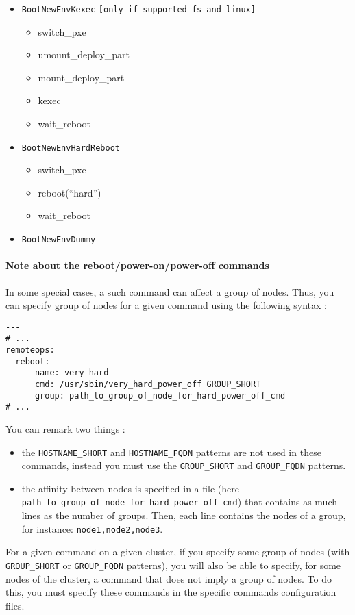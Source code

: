 \documentclass[a4wide,10pt,oneside]{book}
\begin{document}
\begin{itemize}
\begin{itemize}
    \item \texttt{BootNewEnvKexec} \texttt{[only if supported fs and linux]}
      \begin{itemize}
      \item switch\_pxe
      \item umount\_deploy\_part
      \item mount\_deploy\_part
      \item kexec
      \item wait\_reboot
      \end{itemize}
    \item \texttt{BootNewEnvHardReboot}
      \begin{itemize}
      \item switch\_pxe
      \item reboot(``hard'')
      \item wait\_reboot
      \end{itemize}
    \item \texttt{BootNewEnvDummy}
  \end{itemize}
\end{itemize}

\paragraph{Note about the reboot/power-on/power-off commands}\label{sec:groupcmd}
In some special cases, a such command can affect a group of nodes. Thus, you can specify group of nodes for a given command using the following syntax :
\begin{small}
\begin{verbatim}
---
# ...
remoteops:
  reboot:
    - name: very_hard
      cmd: /usr/sbin/very_hard_power_off GROUP_SHORT
      group: path_to_group_of_node_for_hard_power_off_cmd
# ...
\end{verbatim}
\end{small}
You can remark two things :
\begin{itemize}
\item the \texttt{HOSTNAME\_SHORT} and \texttt{HOSTNAME\_FQDN} patterns are not used in these commands, instead you must use the \texttt{GROUP\_SHORT} and \texttt{GROUP\_FQDN} patterns.
\item the affinity between nodes is specified in a file (here \texttt{path\_to\_group\_of\_node\_for\_hard\_power\_off\_cmd}) that contains as much lines as the number of groups. Then, each line contains the nodes of a group, for instance: \texttt{node1,node2,node3}.
\end{itemize}
For a given command on a given cluster, if you specify some group of nodes (with \texttt{GROUP\_SHORT} or \texttt{GROUP\_FQDN} patterns), you will also be able to specify, for some nodes of the cluster, a command that does not imply a group of nodes. To do this, you must specify these commands in the specific commands configuration files.
\end{document}
